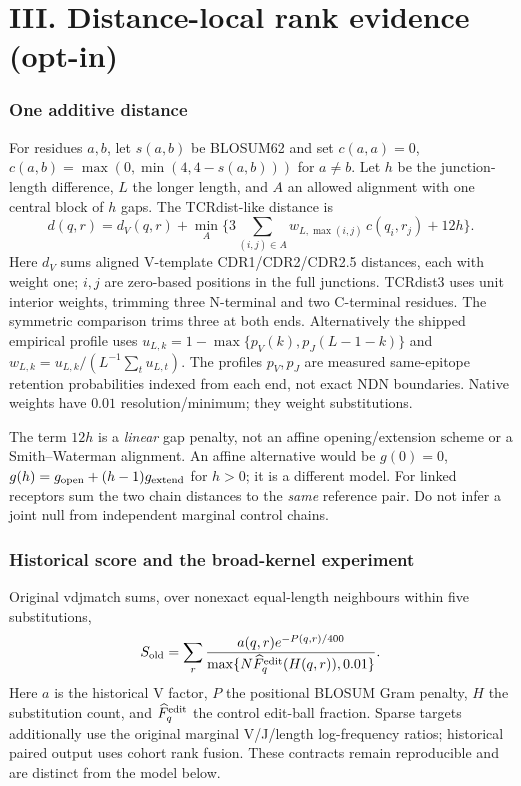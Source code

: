 \documentclass[10pt,a4paper]{article}
\theoremstyle{definition}
\begin{document}
\part*{III. Distance-local rank evidence (opt-in)}

\section{One additive distance}
For residues $a,b$, let $s(a,b)$ be BLOSUM62 and set $c(a,a)=0$,
$c(a,b)=\max(0,\min(4,4-s(a,b)))$ for $a\ne b$. Let $h$ be the junction-length difference, $L$ the
longer length, and $A$ an allowed alignment with one central block of $h$ gaps. The TCRdist-like
distance is
\[
d(q,r)=d_V(q,r)+\min_A\Big\{3\sum_{(i,j)\in A}w_{L,\max(i,j)}\,c(q_i,r_j)+12h\Big\}.
\]
Here $d_V$ sums aligned V-template CDR1/CDR2/CDR2.5 distances, each with weight one; $i,j$ are
zero-based positions in the full junctions. TCRdist3 uses unit interior weights, trimming three
N-terminal and two C-terminal residues. The symmetric comparison trims three at both ends.
Alternatively the shipped empirical profile uses $u_{L,k}=1-\max\{p_V(k),p_J(L-1-k)\}$ and
$w_{L,k}=u_{L,k}/(L^{-1}\sum_t u_{L,t})$. The profiles $p_V,p_J$ are measured same-epitope retention
probabilities indexed from each end, not exact NDN boundaries. Native weights have $0.01$
resolution/minimum; they weight substitutions.

The term $12h$ is a \emph{linear} gap penalty, not an affine opening/extension scheme or a
Smith--Waterman alignment. An affine alternative would be $g(0)=0$,
$g(h)=g_{\rm open}+(h-1)g_{\rm extend}$ for $h>0$; it is a different model. For linked receptors sum
the two chain distances to the \emph{same} reference pair. Do not infer a joint null from
independent marginal control chains.

\section{Historical score and the broad-kernel experiment}
Original vdjmatch sums, over nonexact equal-length neighbours within five substitutions,
\[
S_{\rm old}=\sum_r\frac{a(q,r)e^{-P(q,r)/400}}{\max\{N\widehat F_q^{\rm edit}(H(q,r)),0.01\}}.
\]
Here $a$ is the historical V factor, $P$ the positional BLOSUM Gram penalty, $H$ the substitution
count, and $\widehat F_q^{\rm edit}$ the control edit-ball fraction. Sparse targets additionally use
the original marginal V/J/length log-frequency ratios; historical paired output uses cohort rank
fusion. These contracts remain reproducible and are distinct from the model below.
\end{document}
